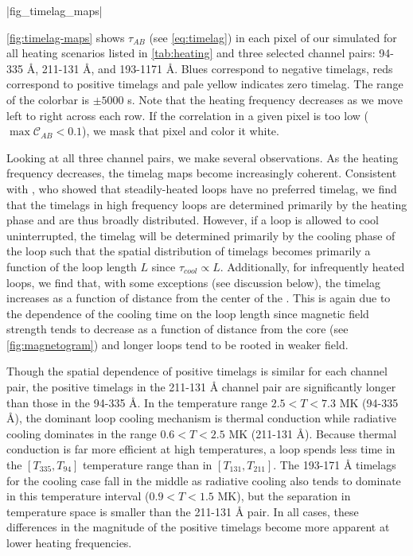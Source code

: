 |fig_timelag_maps|

\autoref{fig:timelag-maps} shows $\tau_{AB}$ (see \autoref{eq:timelag}) in each pixel of our simulated \AR{} for all heating scenarios listed in \autoref{tab:heating} and three selected channel pairs: 94-335 \AA{}, 211-131 \AA{}, and 193-1171 \AA{}. Blues correspond to negative timelags, reds correspond to positive timelags and pale yellow indicates zero timelag. The range of the colorbar is $\pm5000$ s. Note that the heating frequency decreases as we move left to right across each row. If the correlation in a given pixel is too low ($\max{\mathcal{C}_{AB}}<0.1$), we mask that pixel and color it white.

Looking at all three channel pairs, we make several observations. As the heating frequency decreases, the timelag maps become increasingly coherent. Consistent with \citet{viall_signatures_2016}, who showed that steadily-heated loops have no preferred timelag, we find that the timelags in high frequency loops are determined primarily by the heating phase and are thus broadly distributed. However, if a loop is allowed to cool uninterrupted, the timelag will be determined primarily by the cooling phase of the loop such that the spatial distribution of timelags becomes primarily a function of the loop length $L$ since $\tau_{cool}\propto L$. Additionally, for infrequently heated loops, we find that, with some exceptions (see discussion below), the timelag increases as a function of distance from the center of the \AR{}. This is again due to the dependence of the cooling time on the loop length since magnetic field strength tends to decrease as a function of distance from the core (see \autoref{fig:magnetogram}) and longer loops tend to be rooted in weaker field.

Though the spatial dependence of positive timelags is similar for each channel pair, the positive timelags in the 211-131 \AA{} channel pair are significantly longer than those in the 94-335 \AA{}. In the temperature range $2.5<T<7.3$ MK (94-335 \AA{}), the dominant loop cooling mechanism is thermal conduction while radiative cooling dominates in the range $0.6<T<2.5$ MK (211-131 \AA{}). Because thermal conduction is far more efficient at high temperatures, a loop spends less time in the $[T_{335},T_{94}]$ temperature range than in $[T_{131},T_{211}]$. The 193-171 \AA{} timelags for the cooling case fall in the middle as radiative cooling also tends to dominate in this temperature interval ($0.9<T<1.5$ MK), but the separation in temperature space is smaller than the 211-131 \AA{} pair. In all cases, these differences in the magnitude of the positive timelags become more apparent at lower heating frequencies.

